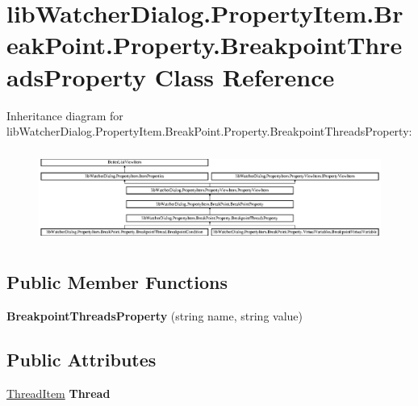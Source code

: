\hypertarget{classlib_watcher_dialog_1_1_property_item_1_1_break_point_1_1_property_1_1_breakpoint_threads_property}{\section{lib\+Watcher\+Dialog.\+Property\+Item.\+Break\+Point.\+Property.\+Breakpoint\+Threads\+Property Class Reference}
\label{classlib_watcher_dialog_1_1_property_item_1_1_break_point_1_1_property_1_1_breakpoint_threads_property}
}
Inheritance diagram for lib\+Watcher\+Dialog.\+Property\+Item.\+Break\+Point.\+Property.\+Breakpoint\+Threads\+Property\+:\begin{figure}[H]
\begin{center}
\leavevmode
\includegraphics[height=3.037975cm]{classlib_watcher_dialog_1_1_property_item_1_1_break_point_1_1_property_1_1_breakpoint_threads_property}
\end{center}
\end{figure}
\subsection*{Public Member Functions}
\begin{DoxyCompactItemize}
\item 
\hypertarget{classlib_watcher_dialog_1_1_property_item_1_1_break_point_1_1_property_1_1_breakpoint_threads_property_a55e85f81803c08aba2df61d2593a4c5e}{{\bfseries Breakpoint\+Threads\+Property} (string name, string value)}\label{classlib_watcher_dialog_1_1_property_item_1_1_break_point_1_1_property_1_1_breakpoint_threads_property_a55e85f81803c08aba2df61d2593a4c5e}

\end{DoxyCompactItemize}
\subsection*{Public Attributes}
\begin{DoxyCompactItemize}
\item 
\hypertarget{classlib_watcher_dialog_1_1_property_item_1_1_break_point_1_1_property_1_1_breakpoint_threads_property_a5f6d096b1959b9ef2ea26fc438cdf1da}{\hyperlink{classlib_watcher_dialog_1_1_property_item_1_1_thread_1_1_thread_item}{Thread\+Item} {\bfseries Thread}}\label{classlib_watcher_dialog_1_1_property_item_1_1_break_point_1_1_property_1_1_breakpoint_threads_property_a5f6d096b1959b9ef2ea26fc438cdf1da}

\end{DoxyCompactItemize}

